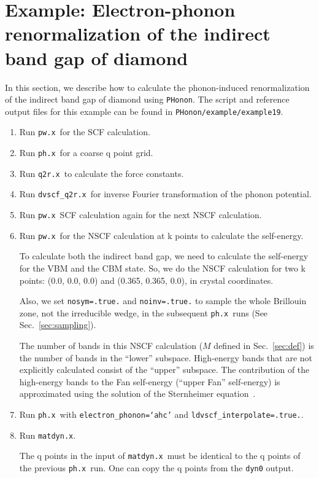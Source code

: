 \documentclass[12pt,a4paper]{article}
\def\pwx{\texttt{pw.x}}
\def\phx{\texttt{ph.x}}
\def\matdynx{\texttt{matdyn.x}}
\def\dvscfqtrx{\texttt{dvscf\_q2r.x}}
\def\qtrx{\texttt{q2r.x}}
\def\PHonon{\texttt{PHonon}}
\begin{document}
\section{Example: Electron-phonon renormalization of the indirect
band gap of diamond}

In this section, we describe how to calculate the phonon-induced renormalization
of the indirect band gap of diamond using \PHonon.
The script and reference output files for this example can be found in
\verb|PHonon/example/example19|.

\begin{enumerate}
\item Run \pwx\ for the SCF calculation.
\item Run \phx\ for a coarse q point grid.
\item Run \qtrx\ to calculate the force constants.
\item Run \dvscfqtrx\ for inverse Fourier transformation of the phonon
potential.
\item Run \pwx\ SCF calculation again for the next NSCF calculation.
\item Run \pwx\ for the NSCF calculation at k points to calculate the
self-energy.

To calculate both the indirect band gap, we need to calculate the self-energy
for the VBM and the CBM state. So, we do the NSCF calculation for two
k points: (0.0, 0.0, 0.0) and (0.365, 0.365, 0.0), in crystal coordinates.

Also, we set \texttt{nosym=.true.} and \texttt{noinv=.true.} to sample
the whole Brillouin zone, not the irreducible wedge, in the subsequent
\phx\ runs (See Sec.~\ref{sec:sampling}).

The number of bands in this NSCF calculation ($M$ defined in Sec.~\ref{sec:def})
is the number of bands in the ``lower'' subspace.
High-energy bands that are not explicitly calculated
consist of the ``upper'' subspace.
The contribution of the high-energy bands
to the Fan self-energy (``upper Fan'' self-energy) is approximated using
the solution of the Sternheimer equation~\cite{2011Gonze}.

\item Run \phx\ with \texttt{electron\_phonon=`ahc'}
and \texttt{ldvscf\_interpolate=.true.}.
\item Run \matdynx.

The q points in the input of \matdynx\ must be identical to the q points
of the previous \phx\ run. One can copy the q points from the \texttt{dyn0}
output.


\end{enumerate}
\end{document}
